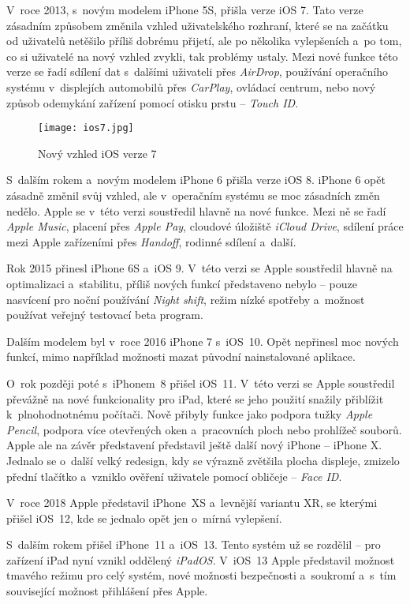 V~roce 2013, s~novým modelem iPhone 5S, přišla verze iOS 7. Tato verze zásadním způsobem změnila vzhled uživatelského rozhraní, které se na začátku od uživatelů netěšilo příliš dobrému přijetí, ale po několika vylepšeních a~po tom, co si uživatelé na nový vzhled zvykli, tak problémy ustaly. Mezi nové funkce této verze se řadí sdílení dat s~dalšími uživateli přes \emph{AirDrop}, používání operačního systému v~displejích automobilů přes \emph{CarPlay}, ovládací centrum, nebo nový způsob odemykání zařízení pomocí otisku prstu – \emph{Touch ID}.

\begin{figure}[h]
	\centering
	\texttt{[image: ios7.jpg]}
	\caption{Nový vzhled iOS verze 7 \cite{ios-7-design}}
\end{figure}

S~dalším rokem a~novým modelem iPhone 6 přišla verze iOS 8. iPhone 6 opět zásadně změnil svůj vzhled, ale v~operačním systému se moc zásadních změn nedělo. Apple se v~této verzi soustředil hlavně na nové funkce. Mezi ně se řadí \emph{Apple Music}, placení přes \emph{Apple Pay}, cloudové úložiště \emph{iCloud Drive}, sdílení práce mezi Apple zařízeními přes \emph{Handoff}, rodinné sdílení a~další.

Rok 2015 přinesl iPhone 6S a~iOS 9. V~této verzi se Apple soustředil hlavně na optimalizaci a~stabilitu, příliš nových funkcí představeno nebylo – pouze nasvícení pro noční používání \emph{Night shift}, režim nízké spotřeby a~možnost používat veřejný testovací beta program.

Dalším modelem byl v~roce 2016 iPhone 7 s~iOS~10. Opět nepřinesl moc nových funkcí, mimo například možnosti mazat původní nainstalované aplikace.

O~rok později poté s~iPhonem~8 přišel iOS~11. V~této verzi se Apple soustředil převážně na nové funkcionality pro iPad, které se jeho použití snažily přiblížit k~plnohodnotnému počítači. Nově přibyly funkce jako podpora tužky \emph{Apple Pencil}, podpora více otevřených oken a~pracovních ploch nebo prohlížeč souborů. Apple ale na závěr představení představil ještě další nový iPhone – iPhone X. Jednalo se o~další velký redesign, kdy se výrazně zvětšila plocha displeje, zmizelo přední tlačítko a~vzniklo ověření uživatele pomocí obličeje – \emph{Face ID}.

V~roce 2018 Apple představil iPhone~XS a~levnější variantu XR, se kterými přišel iOS~12, kde se jednalo opět jen o~mírná vylepšení. 

S~dalším rokem přišel iPhone~11 a~iOS~13. Tento systém už se rozdělil – pro zařízení iPad nyní vznikl oddělený \emph{iPadOS}. V~iOS~13 Apple představil možnost tmavého režimu pro celý systém, nové možnosti bezpečnosti a~soukromí a~s~tím související možnost přihlášení přes Apple.

